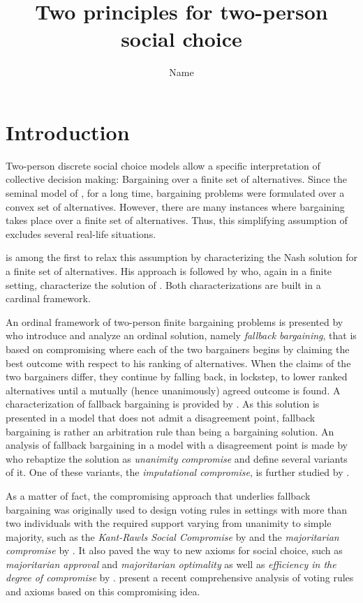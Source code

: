 \documentclass[version=3.21, pagesize, twoside=off, bibliography=totoc, DIV=calc, fontsize=12pt, a4paper]{scrartcl}
\title{Two principles for two-person social choice}
\author{Name}
\affil{Université Paris-Dauphine, PSL Research University, CNRS, LAMSADE, 75016 PARIS, FRANCE\\
}
\begin{document}
\maketitle

\section{Introduction}
\label{sec:intro}

Two-person discrete social choice models allow a specific interpretation of collective decision making: Bargaining over a finite set of alternatives. Since the seminal model of \cite{Nash1950}, for a long time, bargaining problems were formulated over a convex set of alternatives. However, there are many instances where bargaining takes place over a finite set of alternatives. Thus, this simplifying assumption of \cite{Nash1950} excludes several real-life situations. 

\cite{Mariotti1998} is among the first to relax this assumption by characterizing the Nash solution for a finite set of alternatives. His approach is followed by \cite{nagahisa2002axiomatization} who, again in a finite setting, characterize the solution of \cite{kalai1975other}. Both characterizations are built in a cardinal framework. 
 
An ordinal framework of two-person finite bargaining problems is presented by \cite{BramsKilgour2001} who introduce and analyze an ordinal solution, namely \textit{fallback bargaining}, that is based on compromising where each of the two bargainers begins by claiming the best outcome with respect to his ranking of alternatives. When the claims of the two bargainers differ, they continue by falling back, in lockstep, to lower ranked alternatives until a mutually (hence unanimously) agreed outcome is found. A characterization of fallback bargaining is provided by \cite{de2012reason}. As this solution is presented in a model that does not admit a disagreement point, fallback bargaining is rather an arbitration rule than being a bargaining solution. An analysis of fallback bargaining in a model with a disagreement point is made by \cite{KibrisSertel2007} who rebaptize the solution as \textit{unanimity compromise} and define several variants of it. One of these variants, the \textit{imputational compromise}, is further studied by \cite{ConleyWilkie2012}.
 
As a matter of fact, the compromising approach that underlies fallback bargaining was originally used to design voting rules in settings with more than two individuals with the required support varying from unanimity to simple majority, such as the \textit{Kant-Rawls Social Compromise} by \cite{HurwiczSertel1997}  and the \textit{majoritarian compromise} by \cite{sertel1999majoritarian}. It also paved the way to new axioms for social choice, such as \textit{majoritarian approval} and \textit{majoritarian optimality} as well as \textit{efficiency in the degree of compromise} by \cite{ozkal2004efficiency}.
\cite{merlin2019compromise} present a recent comprehensive analysis of voting rules and axioms based on this compromising idea.
\end{document}
